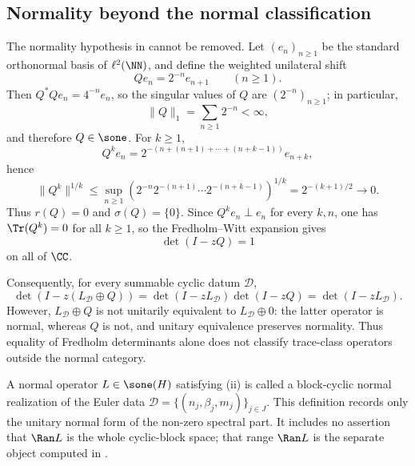 \subsection{Normality beyond the normal classification}
\label{subsec:normality-beyond-normal-classification}

\begin{remark}
  \label{rem:nonnormal-obstruction-after-realization}
  The normality hypothesis in
   cannot be removed. Let
  \((e_n)_{n\ge1}\) be the standard orthonormal basis of \(\ell^2(\NN)\),
  and define the weighted unilateral shift
  \[
    Qe_n=2^{-n}e_{n+1}
    \qquad (n\ge1).
  \]
  Then \(Q^*Qe_n=4^{-n}e_n\), so the singular values of \(Q\) are
  \((2^{-n})_{n\ge1}\); in particular,
  \[
    \|Q\|_1=\sum_{n\ge1}2^{-n}<\infty,
  \]
  and therefore \(Q\in \sone\). For \(k\ge1\),
  \[
    Q^k e_n
    =2^{-(n+(n+1)+\cdots+(n+k-1))}e_{n+k},
  \]
  hence
  \[
    \|Q^k\|^{1/k}
    \le \sup_{n\ge1}
      \left(2^{-n}2^{-(n+1)}\cdots2^{-(n+k-1)}\right)^{1/k}
    =2^{-(k+1)/2}\to0.
  \]
  Thus \(r(Q)=0\) and \(\sigma(Q)=\{0\}\). Since \(Q^k e_n\perp e_n\) for
  every \(k,n\), one has \(\Tr(Q^k)=0\) for all \(k\ge1\), so the
  Fredholm--Witt expansion gives
  \[
    \det(I-zQ)=1
  \]
  on all of \(\CC\).

  Consequently, for every summable cyclic datum \(\mathcal D\),
  \[
    \det(I-z(L_{\mathcal D}\oplus Q))
    =\det(I-zL_{\mathcal D})\det(I-zQ)
    =\det(I-zL_{\mathcal D}).
  \]
  However, \(L_{\mathcal D}\oplus Q\) is not unitarily equivalent to
  \(L_{\mathcal D}\oplus0\): the latter operator is normal, whereas
  \(Q\) is not, and unitary equivalence preserves normality. Thus equality
  of Fredholm determinants alone does not classify trace-class operators
  outside the normal category.
\end{remark}

\begin{definition}
  \label{def:block-cyclic-normal-realization}
  A normal operator \(L\in \sone(H)\) satisfying
  \textup{(ii)} is called a
  block-cyclic normal realization of the Euler data
  \(\mathcal D=\{(n_j,\beta_j,m_j)\}_{j\in J}\). This definition records
  only the unitary normal form of the non-zero spectral part. It includes no
  assertion that \(\Ran L\) is the whole cyclic-block space; that
  range \(\Ran L\) is the separate object computed in
  .
\end{definition}

